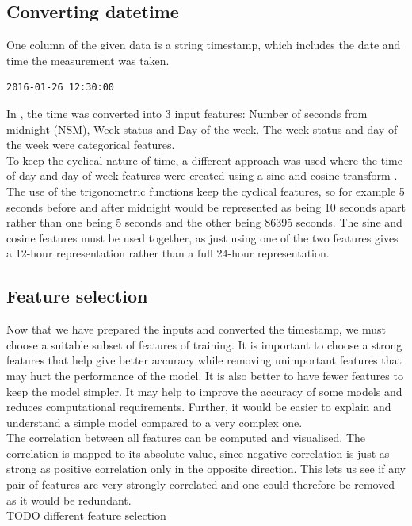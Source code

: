 \documentclass{article}
\newcommand{\n}[0]{\\[\baselineskip]}
\begin{document}
\subsection{Converting datetime}
One column of the given data is a string timestamp, which includes the date and time the measurement was taken. 
\begin{lstlisting}[caption={Example timestamp snippet}, backgroundcolor = \color{lightgray}]
2016-01-26 12:30:00
\end{lstlisting}
In \cite{paper}, the time was converted into 3 input features: Number of seconds from midnight (NSM), Week status and Day of the week. The week status and day of the week were categorical features.
\n
To keep the cyclical nature of time, a different approach was used where the time of day and day of week features were created using a sine and cosine transform \cite{cyclic}. The use of the trigonometric functions keep the cyclical features, so for example 5 seconds before and after midnight would be represented as being 10 seconds apart rather than one being 5 seconds and the other being 86395 seconds. The sine and cosine features must be used together, as just using one of the two features gives a 12-hour representation rather than a full 24-hour representation. 




\subsection{Feature selection}
Now that we have prepared the inputs and converted the timestamp, we must choose a suitable subset of features of training. It is important to choose a strong features that help give better accuracy while removing unimportant features that may hurt the performance of the model. It is also better to have fewer features to keep the model simpler. It may help to improve the accuracy of some models and reduces computational requirements. Further, it would be easier to explain and understand a simple model compared to a very complex one. 
\n
The correlation between all features can be computed and visualised. The correlation is mapped to its absolute value, since negative correlation is just as strong as positive correlation only in the opposite direction. This lets us see if any pair of features are very strongly correlated and one could therefore be removed as it would be redundant. 
\n
TODO different feature selection
\end{document}
